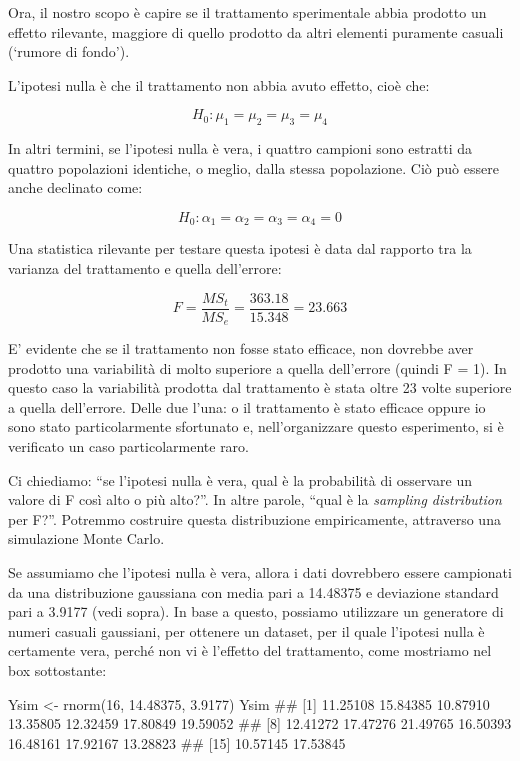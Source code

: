 \documentclass[a4paper,12pt,oneside]{book}
\newenvironment{Shaded}{\begin{snugshade}}{\end{snugshade}}
\newcommand{\DecValTok}[1]{#1}
\newcommand{\FloatTok}[1]{#1}
\newcommand{\DocumentationTok}[1]{#1}
\newcommand{\OtherTok}[1]{#1}
\newcommand{\FunctionTok}[1]{#1}
\newcommand{\NormalTok}[1]{#1}
\begin{document}
Ora, il nostro scopo è capire se il trattamento sperimentale abbia prodotto un effetto rilevante, maggiore di quello prodotto da altri elementi puramente casuali (`rumore di fondo').

L'ipotesi nulla è che il trattamento non abbia avuto effetto, cioè che:

\[H_0: \mu_1 = \mu_2 = \mu_3 = \mu_4\]

In altri termini, se l'ipotesi nulla è vera, i quattro campioni sono estratti da quattro popolazioni identiche, o meglio, dalla stessa popolazione. Ciò può essere anche declinato come:

\[H_0: \alpha_1 = \alpha_2 = \alpha_3 = \alpha_4 = 0\]

Una statistica rilevante per testare questa ipotesi è data dal rapporto tra la varianza del trattamento e quella dell'errore:

\[F = \frac{MS_t}{MS_e} = \frac{363.18}{15.348} = 23.663\]

E' evidente che se il trattamento non fosse stato efficace, non dovrebbe aver prodotto una variabilità di molto superiore a quella dell'errore (quindi F = 1). In questo caso la variabilità prodotta dal trattamento è stata oltre 23 volte superiore a quella dell'errore. Delle due l'una: o il trattamento è stato efficace oppure io sono stato particolarmente sfortunato e, nell'organizzare questo esperimento, si è verificato un caso particolarmente raro.

Ci chiediamo: ``se l'ipotesi nulla è vera, qual è la probabilità di osservare un valore di F così alto o più alto?''. In altre parole, ``qual è la \emph{sampling distribution} per F?''. Potremmo costruire questa distribuzione empiricamente, attraverso una simulazione Monte Carlo.

Se assumiamo che l'ipotesi nulla è vera, allora i dati dovrebbero essere campionati da una distribuzione gaussiana con media pari a 14.48375 e deviazione standard pari a 3.9177 (vedi sopra). In base a questo, possiamo utilizzare un generatore di numeri casuali gaussiani, per ottenere un dataset, per il quale l'ipotesi nulla è certamente vera, perché non vi è l'effetto del trattamento, come mostriamo nel box sottostante:

\begin{Shaded}
\begin{Highlighting}[]
\NormalTok{Ysim }\OtherTok{\textless{}{-}} \FunctionTok{rnorm}\NormalTok{(}\DecValTok{16}\NormalTok{, }\FloatTok{14.48375}\NormalTok{, }\FloatTok{3.9177}\NormalTok{)}
\NormalTok{Ysim}
\DocumentationTok{\#\#  [1] 11.25108 15.84385 10.87910 13.35805 12.32459 17.80849 19.59052}
\DocumentationTok{\#\#  [8] 12.41272 17.47276 21.49765 16.50393 16.48161 17.92167 13.28823}
\DocumentationTok{\#\# [15] 10.57145 17.53845}
\end{Highlighting}
\end{Shaded}
\end{document}
